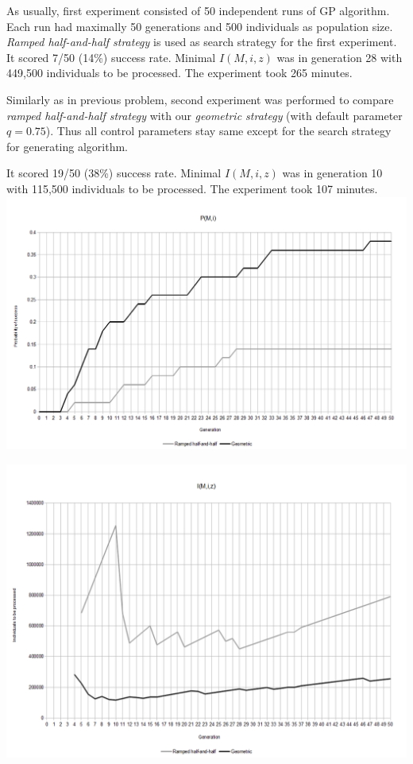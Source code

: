 \documentclass[12pt,a4paper]{report}
\begin{document}
As usually, first experiment consisted of 50 independent runs of GP algorithm.
Each run had maximally 50 generations and 500 individuals as population size.
\textit{Ramped half-and-half strategy} is used as search strategy for the first 
experiment.\\


It scored 7/50 (14\%) success rate. 
Minimal $I(M,i,z)$ was in generation 28 
with 449,500 individuals to be processed.
The experiment took 265 minutes.


Similarly as in previous problem, second experiment was performed to compare 
\textit{ramped half-and-half strategy} with our
\textit{geometric strategy} (with default parameter $q=0.75$). 
Thus all control parameters stay same except for the 
search strategy for generating algorithm.

It scored 19/50 (38\%) success rate. 
Minimal $I(M,i,z)$ was in generation 10 
with 115,500 individuals to be processed.
The experiment took 107 minutes.\\

\includegraphics[scale=0.45]{reports/Ant/p.png}

\includegraphics[scale=0.45]{reports/Ant/i.png}
\end{document}

